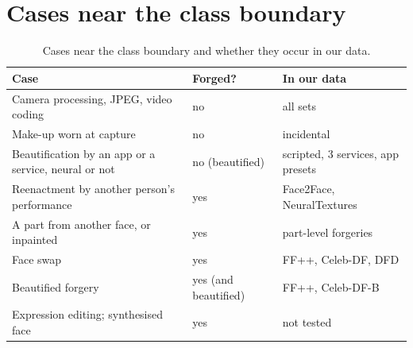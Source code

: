 \documentclass[10pt]{article}
\begin{document}
\section{Cases near the class boundary}
\begin{table}[H]
\centering
\caption{Cases near the class boundary and whether they occur in our data.}
\label{tab:labels}
\footnotesize
\setlength{\tabcolsep}{3pt}
\begin{tabular}{@{}>{\raggedright\arraybackslash}p{}l>{\raggedright\arraybackslash}p{}@{}}
\toprule
Case & Forged? & In our data \\
\midrule
Camera processing, JPEG, video coding & no & all sets \\
Make-up worn at capture & no & incidental \\
Beautification by an app or a service, neural or not & no (beautified) & scripted, 3 services, app presets \\
Reenactment by another person's performance & yes & Face2Face, NeuralTextures \\
A part from another face, or inpainted & yes & part-level forgeries \\
Face swap & yes & FF++, Celeb-DF, DFD \\
Beautified forgery & yes (and beautified) & FF++, Celeb-DF-B \\
Expression editing; synthesised face & yes & not tested \\
\bottomrule
\end{tabular}
\end{table}
\end{document}
